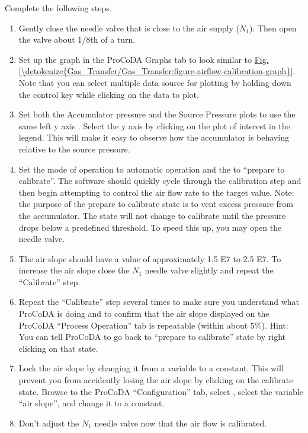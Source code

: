 \documentclass[letterpaper,10pt,english]{sphinxmanual}
\begin{document}
Complete the following steps.
\begin{enumerate}
\item {} 
Gently close the needle valve that is close to the air supply (\(N_1\)). Then open the valve about 1/8th of a turn.

\item {} 
Set up the graph in the ProCoDA Graphs tab to look similar to \hyperref[\detokenize{Gas_Transfer/Gas_Transfer:figure-airflow-calibration-graph}]{Fig.\@ \ref{\detokenize{Gas_Transfer/Gas_Transfer:figure-airflow-calibration-graph}}}. Note that you can select multiple data source for plotting by holding down the control key while clicking on the data to plot.

\item {} 
Set both the Accumulator pressure and the Source Pressure plots to use the same left y axis . Select the y axis by clicking on the plot of interest in the legend. This will make it easy to observe how the accumulator is behaving relative to the source pressure.

\item {} 
Set the mode of operation  to automatic operation and the  to “prepare to calibrate”. The software should quickly cycle through the calibration step and then begin attempting to control the air flow rate to the target value.  Note:  the purpose of the prepare to calibrate state is to vent excess pressure from the accumulator.  The state will not change to calibrate until the pressure drops below a predefined threshold.  To speed this up, you may open the needle valve.

\item {} 
The air slope should have a value of approximately 1.5 E7 to 2.5 E7. To increase the air slope close the \(N_1\) needle valve slightly and repeat the “Calibrate” step.

\item {} 
Repeat the “Calibrate” step several times to make sure you understand what ProCoDA is doing and to confirm that the air slope  displayed on the ProCoDA “Process Operation” tab is repeatable (within about 5\%). Hint: You can tell ProCoDA to go back to “prepare to calibrate” state by right clicking on that state.

\item {} 
Lock the air slope by changing it from a variable to a constant. This will prevent you from accidently losing the air slope by clicking on the calibrate state. Browse to the ProCoDA “Configuration” tab, select , select the variable “air slope”, and change it to a constant.  

\item {} 
Don’t adjust the \(N_1\) needle valve now that the air flow is calibrated.

\end{enumerate}
\end{document}
